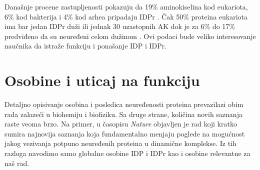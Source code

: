 Današnje procene zastupljenosti pokazuju da 19\% aminokiselina kod
eukariota, 6\% kod bakterija i 4\% kod arhea pripadaju
IDPr \parencite{Peng2014}.  Čak 50\% proteina eukariota ima bar jedan IDPr duži
ili jednak 30 uzastopnih AK \parencite{Xue2012} dok je za 6\% do 17\%
predviđeno da su neuređeni celom dužinom \parencite{Tompa2002}.  Ovi podaci bude
veliko interesovanje naučnika da istraže funkciju i ponašanje IDP i IDPr.

\section {Osobine i uticaj na funkciju}

Detaljno opisivanje osobina i posledica neuređenosti proteina prevazilazi obim
rada zalazeći u biohemiju i biofiziku. Sa druge strane, količina novih saznanja
raste veoma brzo. Na primer, u časopisu \textit{Nature} objavljen je rad
\parencite{rebecca2018} koji kratko sumira najnovija saznanja koja
fundamentalno menjaju poglede na mogućnost jakog vezivanja potpuno neuređenih
proteina u dinamične komplekse.  Iz tih razloga navodimo samo globalne osobine
IDP i IDPr kao i osobine relevantne za naš rad.

